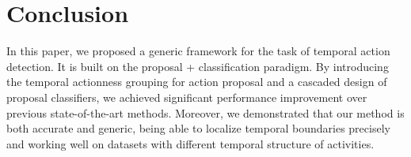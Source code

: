 \documentclass[10pt,twocolumn,letterpaper]{article}
\begin{document}
 
\section{Conclusion}
\label{sec:conclusion}

In this paper, we proposed a generic framework for the task of temporal action detection.
It is built on the proposal + classification paradigm.
By introducing the temporal actionness grouping for action proposal and a cascaded design of proposal classifiers, we achieved significant performance improvement over previous state-of-the-art methods.
Moreover, we demonstrated that our method is both accurate and generic, 
being able to localize temporal boundaries precisely and working well on datasets with different temporal structure of activities.
 

{\small


}
\end{document}
